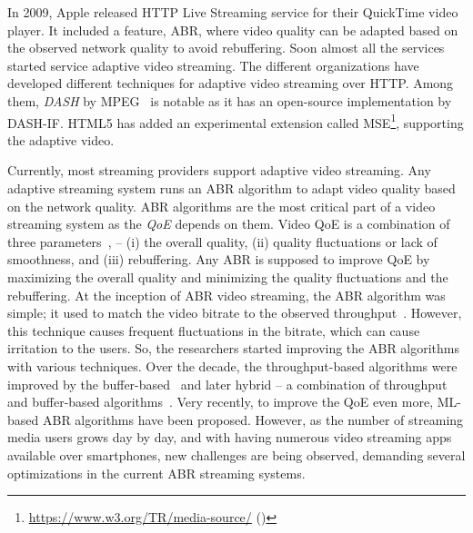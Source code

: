 In 2009, Apple released \ac{HTTP} Live Streaming service for their QuickTime video player. It included a feature, \ac{ABR}, where video quality can be adapted based on the observed network quality to avoid rebuffering. Soon almost all the services started service adaptive video streaming. The different organizations have developed different techniques for adaptive video streaming over \ac{HTTP}. Among them, \textit{\ac{DASH}} by MPEG~\cite{ISO/IEC23009-1:2019} is notable as it has an open-source implementation by \ac{DASH-IF}. \ac{HTML5} has added an experimental extension called \ac{MSE}\footnote{\url{https://www.w3.org/TR/media-source/} (\lastaccessedtoday)}, supporting the adaptive video. 


Currently, most streaming providers support adaptive video streaming. Any adaptive streaming system runs an \ac{ABR} algorithm to adapt video quality based on the network quality. \ac{ABR} algorithms are the most critical part of a video streaming system as the \textit{\ac{QoE}} depends on them. Video \ac{QoE} is a combination of three parameters~\cite{yin2015control}, -- (i) the overall quality, (ii) quality fluctuations or lack of smoothness, and (iii) rebuffering. Any \ac{ABR} is supposed to improve \ac{QoE} by maximizing the overall quality and minimizing the quality fluctuations and the rebuffering. At the inception of \ac{ABR} video streaming, the \ac{ABR} algorithm was simple; it used to match the video bitrate to the observed throughput~\cite{5677508,10.1145/1943552.1943575,10.1145/1943552.1943574}. However, this technique causes frequent fluctuations in the bitrate, which can cause irritation to the users. So, the researchers started improving the \ac{ABR} algorithms with various techniques. Over the decade, the throughput-based algorithms were improved by the buffer-based~\cite{Spiteri2016,10.1145/2910017.2910596,7393865} and later hybrid -- a combination of throughput and buffer-based algorithms~\cite{7247436,140405,yin2015control,10.1145/2670518.2673877}. Very recently, to improve the \ac{QoE} even more, \ac{ML}-based\cite{mao2017neural,Akhtar2018,9155492} \ac{ABR} algorithms have been proposed. However, as the number of streaming media users grows day by day, and with having numerous video streaming apps available over smartphones, new challenges are being observed, demanding several optimizations in the current \ac{ABR} streaming systems. 

